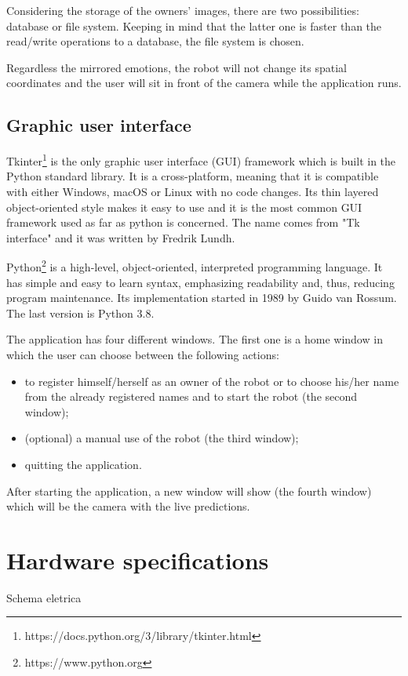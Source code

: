 \documentclass[runningheads,a4paper,12pt]{report}
\begin{document}
Considering the storage of the owners' images, there are two possibilities: database or file system. Keeping in mind that the latter one is faster than the read/write operations to a database, the file system is chosen. 

Regardless the mirrored emotions, the robot will not change its spatial coordinates and the user will sit in front of the camera while the application runs. 

\subsection{Graphic user interface}
Tkinter\footnote{https://docs.python.org/3/library/tkinter.html} is the only graphic user interface (GUI) framework which is built in the Python standard library. It is a cross-platform, meaning that it is compatible with either Windows, macOS or Linux with no code changes. Its thin layered object-oriented style makes it easy to use and it is the most common GUI framework used as far as python is concerned. The name comes from "Tk interface" and it was written by Fredrik Lundh.  

Python\footnote{https://www.python.org} is a high-level, object-oriented, interpreted programming language. It has simple and easy to learn syntax, emphasizing readability and, thus, reducing program maintenance. Its implementation started in 1989 by Guido van Rossum. The last version is Python 3.8.

The application has four different windows. The first one is a home window in which the user can choose between the following actions:

\begin{itemize}

\item to register himself/herself as an owner of the robot or to choose his/her name from the already registered names and to start the robot (the second window);

\item (optional) a manual use of the robot (the third window);

\item quitting the application.
\end{itemize}

After starting the application, a new window will show (the fourth window) which will be the camera with the live predictions.

\newpage

\section{Hardware specifications}
Schema eletrica
\end{document}
